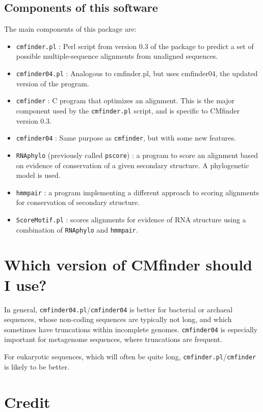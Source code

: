 \documentclass[letterpaper,12pt]{report}
\begin{document}
\subsection{Components of this software}

The main components of this package are:
\begin{itemize}
\item {\tt cmfinder.pl} : Perl script from version 0.3 of the package to predict a set of possible multiple-sequence alignments from unaligned sequences.
\item {\tt cmfinder04.pl} : Analogous to cmfinder.pl, but uses cmfinder04, the updated version of the program.
\item {\tt cmfinder} : C program that optimizes an alignment.  This is the major component used by the {\tt cmfinder.pl} script, and is specific to CMfinder version 0.3.
\item {\tt cmfinder04} : Same purpose as {\tt cmfinder}, but with some new features.
\item {\tt RNAphylo} (previously called {\tt pscore}) : a program to score an alignment based on evidence of conservation of a given secondary structure.  A phylogenetic model is used.
\item {\tt hmmpair} : a program implementing a different approach to scoring alignments for conservation of secondary structure.
\item {\tt ScoreMotif.pl} : scores alignments for evidence of RNA structure using a combination of {\tt RNAphylo} and {\tt hmmpair}.
\end{itemize}

\section{Which version of CMfinder should I use?}

In general, {\tt cmfinder04.pl}/{\tt cmfinder04} is better for bacterial or archaeal sequences, whose non-coding sequences are typically not long, and which sometimes have truncations within incomplete genomes.  {\tt cmfinder04} is especially important for metagenome sequences, where truncations are frequent.

For eukaryotic sequences, which will often be quite long, {\tt cmfinder.pl}/{\tt cmfinder} is likely to be better.

\section{Credit}
\end{document}
